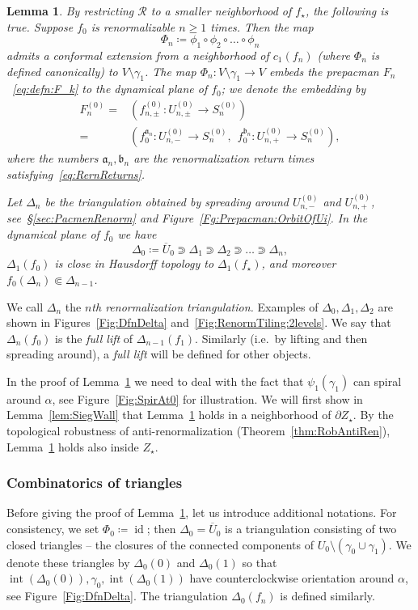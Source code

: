 \documentclass[]{amsart}
\renewcommand{\sp}{{\ \ }}
\newcommand{\bDelta}{{\mathbb{\Delta}}}
\newcommand\RR{\mathcal{R}}
\newcommand\intr{\operatorname{int}}
\newcommand{\str}{{\star}}
\renewcommand{\aa}{{\mathfrak{a}}}
\newcommand{\bb}{{\mathfrak{b}}}
\newtheorem{lem}[thm]{Lemma}
\theoremstyle{remark}
\numberwithin{equation}{section}
\theoremstyle{definition}
\newcommand{\id}{\operatorname{id}}
\begin{document}
\begin{lem}
\label{lem:psi is adjusted}
By restricting $\RR$ to a smaller neighborhood of $f_\str$, the following is true. Suppose $f_0$ is renormalizable $n\ge 1$ times. Then the map 
\[ \Phi_{n} \coloneqq \phi_{1}\circ \phi_{2}\circ \dots\circ \phi_{n}\] 
admits a conformal extension from a neighborhood of $c_1(f_n)$ (where $\Phi_{n}$ is defined canonically) to $V\setminus \gamma_1$. The map $\Phi_{n}\colon V\setminus \gamma_1 \to V$ embeds the prepacman $F_n$~\eqref{eq:defn:F_k} to the dynamical plane of $f_0$; we denote the embedding by 
\begin{align*}
 F^{(0)}_n= &\left(f^{(0)}_{n,\pm }\colon U^{(0)}_{n,\pm}\to S_{n}^{(0)}\right)\\=& \left(f^{\aa_{n}}_{0}\colon U^{(0)}_{n,-}\to S_{n}^{(0)}, \sp f^{\bb_{n}}_{0}\colon U^{(0)}_{n,+}\to S_{n}^{(0)}\right),
\end{align*}
where the numbers $\aa_{n}, \bb_{n}$ are the renormalization return times satisfying~\eqref{eq:RernReturns}.

Let $\bDelta_n$ be the triangulation obtained by spreading around $U^{(0)}_{n,-}$ and $U^{(0)}_{n,+}$, see{\rm{~\S\ref{sec:PacmenRenorm}}} and Figure~{\rm\ref{Fg:Prepacman:OrbitOfUi}}. In the dynamical plane of $f_0$ we have 
\[\bDelta_0\coloneqq \overline U_0\Supset \bDelta_1\Supset \bDelta_2 \Supset \dots \Supset \bDelta_n,\]
$\bDelta_1(f_0)$ is close in Hausdorff topology to $\bDelta_1(f_\str)$, and moreover $f_0(\bDelta_n)\Subset \bDelta_{n-1}$.
\end{lem}
\noindent We call $\bDelta_n$ the \emph{$n$th renormalization triangulation.} Examples of $\bDelta_0,\bDelta_1,\bDelta_2$ are shown in Figures~\ref{Fig:DfnDelta} and~\ref{Fig:RenormTiling:2levels}. We say that $\bDelta_n(f_0)$ is the \emph{full lift} of $\bDelta_{n-1}(f_1)$. Similarly (i.e.~by lifting and then spreading around), a \emph{full lift} will be defined for other objects.

In the proof of Lemma~\ref{lem:psi is adjusted} we need to deal with the fact that $\psi_1(\gamma_1)$ can spiral around $\alpha$, see Figure~\ref{Fig:SpirAt0} for illustration. We will first show in Lemma~\ref{lem:SiegWall} that Lemma~\ref{lem:psi is adjusted} holds in a neighborhood of $\partial Z_\str$. By the topological robustness of anti-renormalization (Theorem~\ref{thm:RobAntiRen}), Lemma~\ref{lem:psi is adjusted} holds also inside $Z_\str$.


\subsubsection{Combinatorics of triangles}
Before giving the proof of Lemma~\ref{lem:psi is adjusted}, let us introduce additional notations. For consistency, we set $\Phi_0\coloneqq \id$; then $\bDelta_0=\overline U_0$ is a triangulation consisting of two closed triangles -- the closures of the connected components of $U_0\setminus (\gamma_0\cup \gamma_1)$. We denote these triangles by $\Delta_0(0)$ and $\Delta_0(1)$ so that $\intr(\Delta_0(0)), \gamma_0, \intr(\Delta_0(1))$ have counterclockwise orientation around $\alpha$, see Figure~\ref{Fig:DfnDelta}. The triangulation $\bDelta_0(f_n)$ is defined similarly.
\end{document}
